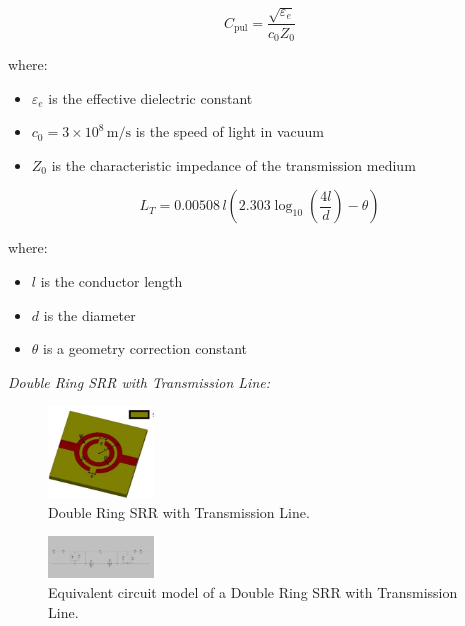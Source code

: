 \documentclass[conference]{IEEEtran}
\begin{document}
    \begin{equation}
    C_{\text{pul}} = \frac{\sqrt{\varepsilon_e}}{c_0 Z_0}
    \end{equation}
    
    \noindent
    where:
    \begin{itemize}
        \item \( \varepsilon_e \) is the effective dielectric constant
        \item \( c_0 = 3 \times 10^8 \, \text{m/s} \) is the speed of light in vacuum
        \item \( Z_0 \) is the characteristic impedance of the transmission medium
    \end{itemize}
    
    \begin{equation}
    L_T = 0.00508 \, l \left( 2.303 \log_{10}\left( \frac{4l}{d} \right) - \theta \right)
    \end{equation}
    
    \noindent
    where:
    \begin{itemize}
        \item \( l \) is the conductor length
        \item \( d \) is the diameter
        \item \( \theta \) is a geometry correction constant
    \end{itemize}

\textit{Double Ring SRR with Transmission Line:}
\begin{figure}
\centering
    \includegraphics[width=0.25\textwidth]{Images/Double_Ring_SRR_Transmission_line.png}
    \caption{Double Ring SRR with Transmission Line.}
\end{figure}

\begin{figure}
\centering
    \includegraphics[width=0.25\textwidth]{Images/With_Transmission_line_Equivalent.png}
    \caption{Equivalent circuit model of a Double Ring SRR with Transmission Line.}
\end{figure}
\end{document}
